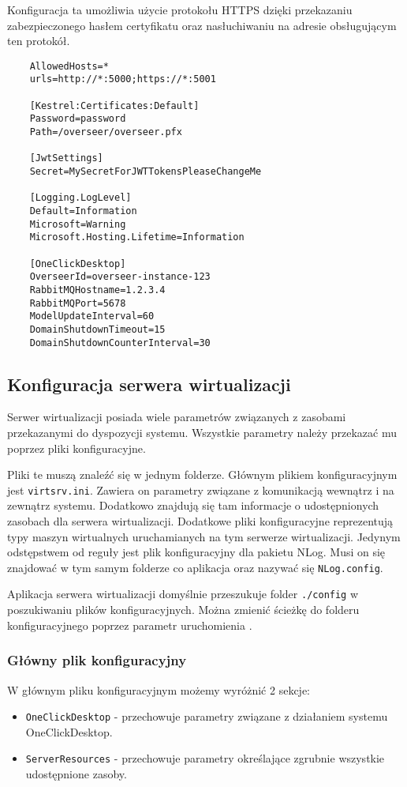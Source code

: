 \documentclass[../opis-rozwiazania.tex]{subfiles}
\begin{document}
Konfiguracja ta umożliwia użycie protokołu HTTPS dzięki przekazaniu zabezpieczonego hasłem certyfikatu oraz nasłuchiwaniu na adresie obsługującym ten protokół.

\begin{verbatim}
	AllowedHosts=*
	urls=http://*:5000;https://*:5001

	[Kestrel:Certificates:Default]
	Password=password
	Path=/overseer/overseer.pfx

	[JwtSettings]
	Secret=MySecretForJWTTokensPleaseChangeMe

	[Logging.LogLevel]
	Default=Information
	Microsoft=Warning
	Microsoft.Hosting.Lifetime=Information

	[OneClickDesktop]
	OverseerId=overseer-instance-123
	RabbitMQHostname=1.2.3.4
	RabbitMQPort=5678
	ModelUpdateInterval=60
	DomainShutdownTimeout=15
	DomainShutdownCounterInterval=30
\end{verbatim}

\subsection{Konfiguracja serwera wirtualizacji}
\label{system_startup.virtsrv_conf}
Serwer wirtualizacji posiada wiele parametrów związanych z zasobami przekazanymi do dyspozycji systemu.
Wszystkie parametry należy przekazać mu poprzez pliki konfiguracyjne.

Pliki te muszą znaleźć się w jednym folderze.
Głównym plikiem konfiguracyjnym jest \texttt{virtsrv.ini}.
Zawiera on parametry związane z komunikacją wewnątrz i na zewnątrz systemu.
Dodatkowo znajdują się tam informacje o udostępnionych zasobach dla serwera wirtualizacji.
Dodatkowe pliki konfiguracyjne reprezentują typy maszyn wirtualnych uruchamianych na tym serwerze wirtualizacji.
Jedynym odstępstwem od reguły jest plik konfiguracyjny dla pakietu NLog.
Musi on się znajdować w tym samym folderze co aplikacja oraz nazywać się \texttt{NLog.config}.

Aplikacja serwera wirtualizacji domyślnie przeszukuje folder \texttt{./config} w poszukiwaniu plików konfiguracyjnych.
Można zmienić ścieżkę do folderu konfiguracyjnego poprzez parametr uruchomienia \texttt{}.

\subsubsection{Główny plik konfiguracyjny}
W głównym pliku konfiguracyjnym możemy wyróżnić 2 sekcje:
\begin{itemize}
	\item \texttt{OneClickDesktop} - przechowuje parametry związane z działaniem systemu OneClickDesktop.
	\item \texttt{ServerResources} - przechowuje parametry określające zgrubnie wszystkie udostępnione zasoby.
\end{itemize}
\end{document}
